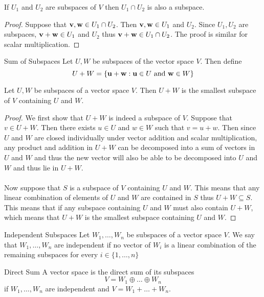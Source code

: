 \documentclass[a4paper]{article}
\begin{document}
\begin{prp}{}{} If $U_1$ and $U_2$ are subspaces of $V$ then $U_1\cap U_2$ is also a subspace. \tcbline
\begin{proof} Suppose that $\vb{v},\vb{w}\in U_1\cap U_2$. Then $\vb{v},\vb{w}\in U_1$ and $U_2$. Since $U_1,U_2$ are subspaces, $\vb{v}+\vb{w}\in U_1$ and $U_2$ thus $\vb{v}+\vb{w}\in U_1\cap U_2$. The proof is similar for scalar multiplication. 
\end{proof}
\end{prp}

\begin{defn}{Sum of Subspaces}{} Let $U,W$ be subspaces of the vector space $V$. Then define $$U+W=\{\vb{u}+\vb{w}:\vb{u}\in U\text{ and }\vb{w}\in W\}$$
\end{defn}

\begin{prp}{}{} Let $U,W$ be subspaces of a vector space $V$. Then $U+W$ is the smallest subspace of $V$ containing $U$ and $W$. \tcbline
\begin{proof}
We first show that $U+W$ is indeed a subspace of $V$. Suppose that $v\in U+W$. Then there exists $u\in U$ and $w\in W$ such that $v=u+w$. Then since $U$ and $W$ are closed individually under vector addition and scalar multiplication, any product and addition in $U+W$ can be decomposed into a sum of vectors in $U$ and $W$ and thus the new vector will also be able to be decomposed into $U$ and $W$ and thus lie in $U+W$. \\~\\
Now suppose that $S$ is a subspace of $V$ containing $U$ and $W$. This means that any linear combination of elements of $U$ and $W$ are contained in $S$ thus $U+W\subseteq S$. This means that if any subspace containing $U$ and $W$ must also contain $U+W$, which means that $U+W$ is the smallest subspace containing $U$ and $W$. 
\end{proof}
\end{prp}

\begin{defn}{Independent Subspaces}{} Let $W_1,\dots,W_n$ be subspaces of a vector space $V$. We say that $W_1,\dots,W_n$ are independent if no vector of $W_i$ is a linear combination of the remaining subspaces for every $i\in\{1,\dots,n\}$
\end{defn}

\begin{defn}{Direct Sum}{} A vector space is the direct sum of its subspaces $$V=W_1\oplus\dots\oplus W_n$$ if $W_1,\dots,W_n$ are independent and $V=W_1+\dots+W_n$. 
\end{defn}
\end{document}
